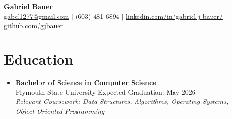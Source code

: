 \documentclass[11pt]{article}
\begin{document}
\begin{center}
    {\LARGE \textbf{Gabriel Bauer}} \\
    \vspace{0.1in}
    \href{mailto:gabel1277@gmail.com}{gabel1277@gmail.com} $\vert$ 
    (603) 481-6894 $\vert$ 
    \href{https://www.linkedin.com/in/gabriel-j-bauer/}{linkedin.com/in/gabriel-j-bauer/} $\vert$
    \href{https://github.com/gjbauer}{github.com/gjbauer}
\end{center}

\section*{Education}
\vspace{-0.1in}
\begin{itemize}[leftmargin=*]
    \item \textbf{Bachelor of Science in Computer Science} \\
    Plymouth State University \hfill Expected Graduation: May 2026 \\
    \textit{Relevant Coursework: Data Structures, Algorithms, Operating Systems, Object-Oriented Programming}
\end{itemize}
\end{document}
